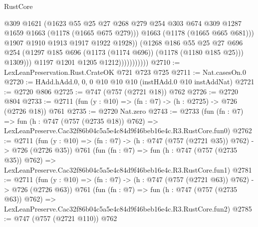 \begin{lexlean}{RustCore}
\begin{coremodule}
                                    @309
                                    @1621
                                    (@1623
                                      @55
                                      @25
                                      @27
                                      @268
                                      @279
                                      @254
                                      @303
                                      @674
                                      @309
                                      @1287
                                      @1659
                                      @1663
                                      (@1178 (@1665 @675 @279)))
                                    @1663
                                    (@1178 (@1665 @665 @681)))
                                  @1907
                                  @1910
                                  @1913
                                  @1917
                                  @1922
                                  @1928))
                              (@1268
                                @186
                                @55
                                @25
                                @27
                                @696
                                @254
                                (@1297 @185 @696 (@1173 (@1174 @696)) (@1178 (@1180 @185 @25)))
                                @1309)))
                          @1197
                          @1201
                          @1205
                          @1212)))))))))))
@2710 := LexLeanPreservation.Rust.CrateOK @721 @723 @725
@2711 := Nat.casesOn.{0}
@2720 := HAdd.hAdd.{0, 0, 0} @10 @10 @10 (instHAdd.{0} @10 instAddNat)
@2721 := @2720 @806
@2725 := @747 (@757 (@2721 @18)) @762
@2726 := @2720 @804
@2733 := @2711 (fun (y : @10) => (fn : @7) -> (h : @2725) -> @726 (@2726 @18)) @761
@2735 := @2720 Nat.zero
@2743 := @2733
    (fun (fn : @7) =>
    fun (h : @747 (@757 (@2735 @18)) @762) =>
    LexLeanPreserve.Cac32f86b04c5a5e4c84d9f46beb16e4c.R3.RustCore.fun0)
@2762 := @2711
    (fun (y : @10) => (fn : @7) -> (h : @747 (@757 (@2721 @35)) @762) -> @726 (@2726 @35))
    @761
    (fun (fn : @7) =>
    fun (h : @747 (@757 (@2735 @35)) @762) =>
    LexLeanPreserve.Cac32f86b04c5a5e4c84d9f46beb16e4c.R3.RustCore.fun1)
@2781 := @2711
    (fun (y : @10) => (fn : @7) -> (h : @747 (@757 (@2721 @63)) @762) -> @726 (@2726 @63))
    @761
    (fun (fn : @7) =>
    fun (h : @747 (@757 (@2735 @63)) @762) =>
    LexLeanPreserve.Cac32f86b04c5a5e4c84d9f46beb16e4c.R3.RustCore.fun2)
@2785 := @747 (@757 (@2721 @110)) @762

\end{coremodule}
\end{lexlean}

